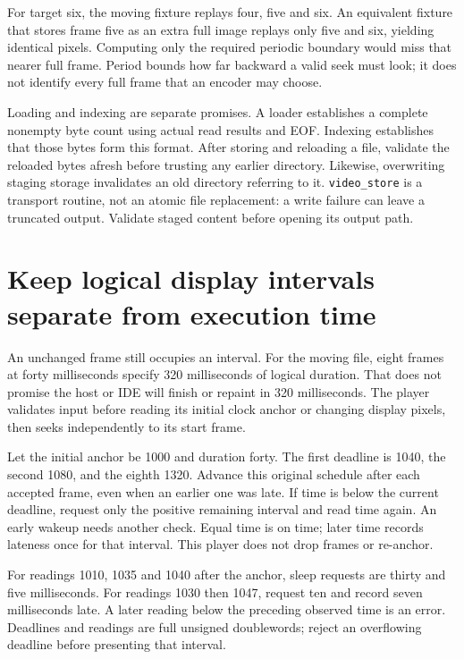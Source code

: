 For target six, the moving fixture replays four, five and six. An equivalent
fixture that stores frame five as an extra full image replays only five and
six, yielding identical pixels. Computing only the required periodic boundary
would miss that nearer full frame. Period bounds how far backward a valid seek
must look; it does not identify every full frame that an encoder may choose.



Loading and indexing are separate promises. A loader establishes a complete
nonempty byte count using actual read results and EOF. Indexing establishes
that those bytes form this format. After storing and reloading a file, validate
the reloaded bytes afresh before trusting any earlier directory. Likewise,
overwriting staging storage invalidates an old directory referring to it.
\texttt{video\_store} is a transport routine, not an atomic file replacement:
a write failure can leave a truncated output. Validate staged content before
opening its output path.

\section{Keep logical display intervals separate from execution time}

An unchanged frame still occupies an interval. For the moving file, eight
frames at forty milliseconds specify 320 milliseconds of logical duration.
That does not promise the host or IDE will finish or repaint in 320 milliseconds.
The player validates input before reading its initial clock anchor or changing
display pixels, then seeks independently to its start frame.

Let the initial anchor be 1000 and duration forty. The first deadline is 1040,
the second 1080, and the eighth 1320. Advance this original schedule after each
accepted frame, even when an earlier one was late. If time is below the current
deadline, request only the positive remaining interval and read time again.
An early wakeup needs another check. Equal time is on time; later time records
lateness once for that interval. This player does not drop frames or re-anchor.

For readings 1010, 1035 and 1040 after the anchor, sleep requests are thirty
and five milliseconds. For readings 1030 then 1047, request ten and record
seven milliseconds late. A later reading below the preceding observed time
is an error. Deadlines and readings are full unsigned doublewords; reject
an overflowing deadline before presenting that interval.

